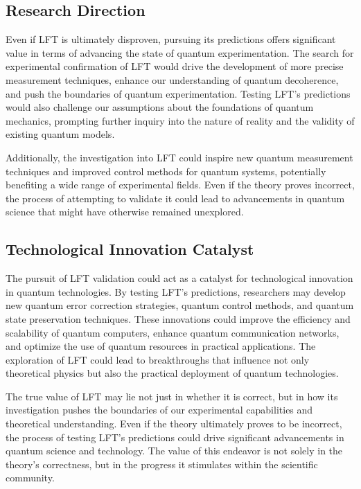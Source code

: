 \subsection{Research Direction}

Even if LFT is ultimately disproven, pursuing its predictions offers significant value in terms of advancing the state of quantum experimentation. The search for experimental confirmation of LFT would drive the development of more precise measurement techniques, enhance our understanding of quantum decoherence, and push the boundaries of quantum experimentation. Testing LFT's predictions would also challenge our assumptions about the foundations of quantum mechanics, prompting further inquiry into the nature of reality and the validity of existing quantum models.

Additionally, the investigation into LFT could inspire new quantum measurement techniques and improved control methods for quantum systems, potentially benefiting a wide range of experimental fields. Even if the theory proves incorrect, the process of attempting to validate it could lead to advancements in quantum science that might have otherwise remained unexplored.

\subsection{Technological Innovation Catalyst}

The pursuit of LFT validation could act as a catalyst for technological innovation in quantum technologies. By testing LFT's predictions, researchers may develop new quantum error correction strategies, quantum control methods, and quantum state preservation techniques. These innovations could improve the efficiency and scalability of quantum computers, enhance quantum communication networks, and optimize the use of quantum resources in practical applications. The exploration of LFT could lead to breakthroughs that influence not only theoretical physics but also the practical deployment of quantum technologies.

The true value of LFT may lie not just in whether it is correct, but in how its investigation pushes the boundaries of our experimental capabilities and theoretical understanding. Even if the theory ultimately proves to be incorrect, the process of testing LFT's predictions could drive significant advancements in quantum science and technology. The value of this endeavor is not solely in the theory's correctness, but in the progress it stimulates within the scientific community.